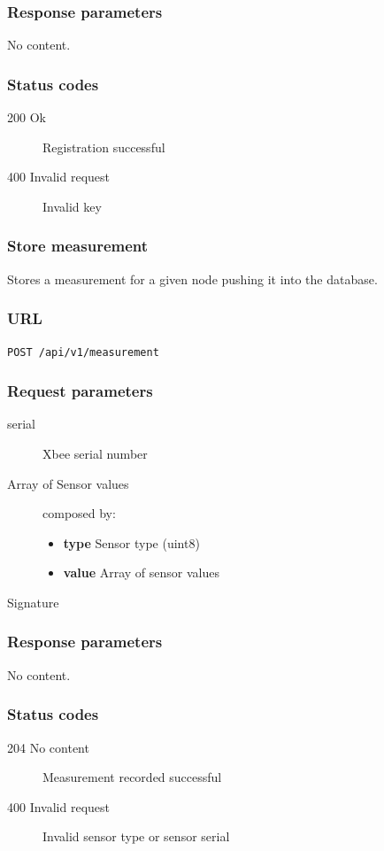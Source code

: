 \documentclass[a4paper,11pt]{scrartcl}
\begin{document}
\subsubsection*{Response parameters}
No content.

\subsubsection*{Status codes}
\begin{description}
\item[200 Ok] Registration successful
\item[400 Invalid request] Invalid key
\end{description}



\subsubsection{Store measurement}
Stores a measurement for a given node pushing it into the database.

\subsubsection*{URL}
\texttt{POST /api/v1/measurement}

\subsubsection*{Request parameters}
\begin{description}
\item[serial] Xbee serial number
\item[Array of Sensor values] composed by:
\begin{itemize}
    \item \textbf{type} Sensor type (uint8)
    \item \textbf{value} Array of sensor values
\end{itemize}
\item[Signature]
\end{description}

\subsubsection*{Response parameters}
No content.

\subsubsection*{Status codes}
\begin{description}
\item[204 No content] Measurement recorded successful
\item[400 Invalid request] Invalid sensor type or sensor serial
\end{description}
\end{document}
